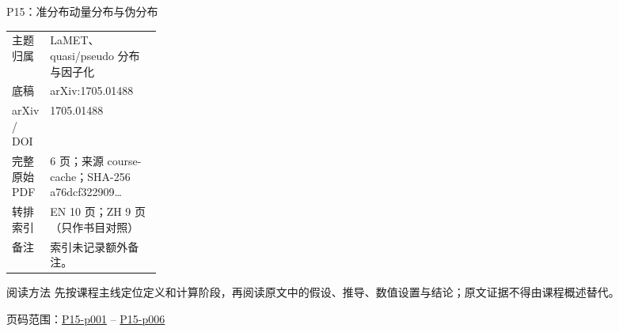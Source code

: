 \documentclass[aspectratio=169,10pt]{ctexbeamer}
\begin{document}
\begin{frame}[t]{P15：准分布动量分布与伪分布}
\small\begin{tabularx}{\linewidth}{p{0.22\linewidth}Y}
\toprule 主题归属 & LaMET、quasi/\allowbreak{}pseudo 分布与因子化\\
底稿 & arXiv:1705.01488\\
arXiv / DOI & 1705.01488\\
完整原始 PDF & 6 页；来源 course-cache；SHA-256 a76dcf322909\ldots\\
转排索引 & EN 10 页；ZH 9 页（只作书目对照）\\
备注 & 索引未记录额外备注。\\
\bottomrule\end{tabularx}\vspace{0.25cm}
\begin{block}{阅读方法}
先按课程主线定位定义和计算阶段，再阅读原文中的假设、推导、数值设置与结论；原文证据不得由课程概述替代。
\end{block}
\vfill 页码范围：\hyperlink{P15-p001}{P15-p001} -- \hyperlink{P15-p006}{P15-p006}
\end{frame}
\end{document}
